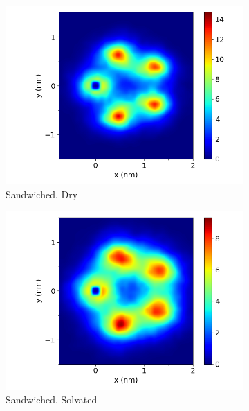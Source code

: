\documentclass[journal=jpcbfk,manusciprt=article]{achemso}
\begin{document}
  \begin{figure}
  \centering
  \begin{subfigure}{0.47\textwidth}
        \includegraphics[width=1\linewidth]{layered_xy_correlation.png}
        \caption{Sandwiched, Dry}
        \label{fig:layered_xy_correlation_comparison}
  \end{subfigure}
  \begin{subfigure}{0.47\textwidth}
        \includegraphics[width=1\linewidth]{layered_solvated_xy_correlation.png}
        \caption{Sandwiched, Solvated}
        \label{fig:layered_solvated_xy_correlation}
  \end{subfigure}
  \begin{subfigure}{0.47\textwidth}

\end{subfigure}
\end{figure}
\end{document}
